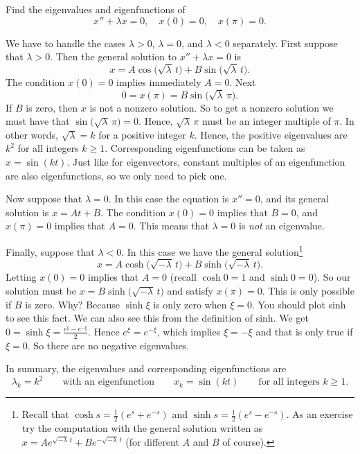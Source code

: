 \begin{example} \label{bvp:eig1ex}
Find the eigenvalues and eigenfunctions of
\begin{equation*}
x'' + \lambda x = 0, \quad x(0) = 0, \quad x(\pi) = 0 .
\end{equation*}

We have to handle
the cases $\lambda > 0$, $\lambda = 0$, and $\lambda < 0$ separately.
First suppose that $\lambda > 0$.  Then
the general solution to $x''+\lambda x = 0$ is
\begin{equation*}
x = A \cos \bigl( \sqrt{\lambda}\, t\bigr)
+ B \sin \bigl( \sqrt{\lambda}\, t\bigr).
\end{equation*}
The condition $x(0) = 0$ implies immediately $A = 0$.
Next
\begin{equation*}
0 = x(\pi) = B \sin \bigl( \sqrt{\lambda}\, \pi \bigr) .
\end{equation*}
If $B$ is zero, then $x$ is not a nonzero solution.  So to get a nonzero
solution we must have that $\sin \bigl( \sqrt{\lambda}\, \pi\bigr) = 0$.  Hence,
$\sqrt{\lambda}\, \pi$ must be an integer multiple of $\pi$.  In other words,
 $\sqrt{\lambda} = k$ for a positive integer $k$.
Hence, the positive eigenvalues are
$k^2$ for all integers $k \geq 1$.  Corresponding eigenfunctions
can be taken as $x=\sin (k t)$.  Just like for eigenvectors, constant
multiples of an eigenfunction are also eigenfunctions,
so we only need to pick one.

Now suppose that $\lambda = 0$.  In this case the equation is $x'' = 0$,
and its general solution is $x = At + B$.  The condition $x(0) = 0$ implies
that $B=0$, and $x(\pi) = 0$ implies that $A = 0$.  This means that $\lambda
= 0$ is \emph{not} an eigenvalue.

Finally, suppose that $\lambda < 0$.  In this case we have the general
solution\footnote{Recall that
$\cosh s = \frac{1}{2}(e^s+e^{-s})$
and
$\sinh s = \frac{1}{2}(e^s-e^{-s})$.  As an exercise
try the computation with the general solution written as
$x = A e^{\sqrt{-\lambda}\, t} + B e^{-\sqrt{-\lambda}\, t}$ (for
different $A$ and $B$ of course).}
\begin{equation*}
x = A \cosh \bigl( \sqrt{-\lambda}\, t\bigr)
+ B \sinh \bigl( \sqrt{-\lambda}\, t \bigr) .
\end{equation*}
Letting $x(0) = 0$ implies that $A = 0$ (recall $\cosh 0 = 1$ and $\sinh 0 =
0$).  So our solution must be $x = B \sinh \bigl( \sqrt{-\lambda}\, t \bigr)$ and satisfy
$x(\pi) = 0$.  This is only possible if $B$ is zero.  Why?  Because
$\sinh \xi$ is only zero when $\xi=0$.  You should plot sinh to see this
fact.
We can also see this from the definition of sinh.
We get $0 = \sinh \xi = \frac{e^\xi -
e^{-\xi}}{2}$.  Hence $e^\xi = e^{-\xi}$, which implies $\xi = -\xi$ and that is only
true if $\xi=0$.  So there are no negative eigenvalues.

In summary, the eigenvalues and corresponding eigenfunctions are
\begin{equation*}
\lambda_k = k^2 \qquad \text{with an eigenfunction} \qquad x_k = \sin (k t)
\qquad \text{for all integers } k \geq 1 .
\end{equation*}
\end{example}

